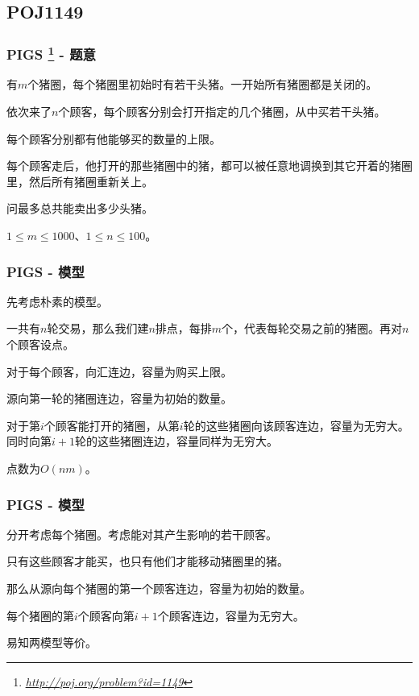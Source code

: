 \documentclass[9pt,dvipsnames,table]{beamer}
\newcommand{\hlink}[1]{
	\footnote{\fontsize{6pt}{\baselineskip}\href{#1}{\textsl{\underline{#1}}}}
}
\begin{document}
\subsection{POJ1149}
\begin{frame}
	\frametitle{PIGS\hlink{http://poj.org/problem?id=1149} - 题意}
	有$m$个猪圈，每个猪圈里初始时有若干头猪。一开始所有猪圈都是关闭的。
	
	依次来了$n$个顾客，每个顾客分别会打开指定的几个猪圈，从中买若干头猪。
	
	每个顾客分别都有他能够买的数量的上限。
	
	每个顾客走后，他打开的那些猪圈中的猪，都可以被任意地调换到其它开着的猪圈里，然后所有猪圈重新关上。
	
	问最多总共能卖出多少头猪。
	
	$1 \leq m \leq 1000$、$1 \leq n \leq 100$。
\end{frame}
\begin{frame}
	\frametitle{PIGS - 模型}
	先考虑朴素的模型。
	
	一共有$n$轮交易，那么我们建$n$排点，每排$m$个，代表每轮交易之前的猪圈。再对$n$个顾客设点。\pause
	
	对于每个顾客，向汇连边，容量为购买上限。
	
	源向第一轮的猪圈连边，容量为初始的数量。\pause
	
	对于第$i$个顾客能打开的猪圈，从第$i$轮的这些猪圈向该顾客连边，容量为无穷大。同时向第$i+1$轮的这些猪圈连边，容量同样为无穷大。
	
	点数为$O(nm)$。
\end{frame}
\begin{frame}
	\frametitle{PIGS - 模型}
	分开考虑每个猪圈。考虑能对其产生影响的若干顾客。
	
	只有这些顾客才能买，也只有他们才能移动猪圈里的猪。\pause
	
	那么从源向每个猪圈的第一个顾客连边，容量为初始的数量。
	
	每个猪圈的第$i$个顾客向第$i+1$个顾客连边，容量为无穷大。
	
	易知两模型等价。
\end{frame}
\end{document}
